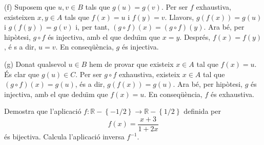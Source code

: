 \begin{solucio}
(f) Suposem que $u,v\in B$ tals que $g(u)=g(v)$. Per ser $f$ exhaustiva,
existeixen $x,y\in A$ tals que $f(x)=u$ i $f(y)=v$. Llavors, $g\left(
f(x)\right) =g(u)$ i $g\left( f(y)\right) =g(v)$ i, per tant, $(g\circ
f)(x)=(g\circ f)(y)$. Ara b\'{e}, per hip\`{o}tesi, $g\circ f$ \'{e}s
injectiva, amb el que dedu\"{\i}m que $x=y$. Despr\'{e}s, $f(x)=f(y)$, \'{e}%
s a dir, $u=v$. En conseq\"{u}\`{e}ncia, $g$ \'{e}s injectiva.

(g) Donat qualsevol $u\in B$ hem de provar que existeix $x\in A$ tal que $%
f(x)=u$. \'{E}s clar que $g(u)\in C$. Per ser $g\circ f$ exhaustiva,
existeix $x\in A$ tal que $(g\circ f)(x)=g(u)$, \'{e}s a dir, $g\left(
f(x)\right) =g(u)$. Ara b\'{e}, per hip\`{o}tesi, $g$ \'{e}s injectiva, amb
el que dedu\"{\i}m que $f(x)=u$. En conseq\"{u}\`{e}ncia, $f$ \'{e}s
exhaustiva.
\end{solucio}

\begin{exercici}
Demostra que l'aplicaci\'{o} $f:\mathbb{R}-\left\{ -1/2\right\}
\longrightarrow \mathbb{R}-\left\{ 1/2\right\} $ definida per%
\begin{equation*}
f(x)=\frac{x+3}{1+2x}
\end{equation*}%
\'{e}s bijectiva. Calcula l'aplicaci\'{o} inversa $f^{-1}$.
\end{exercici}

